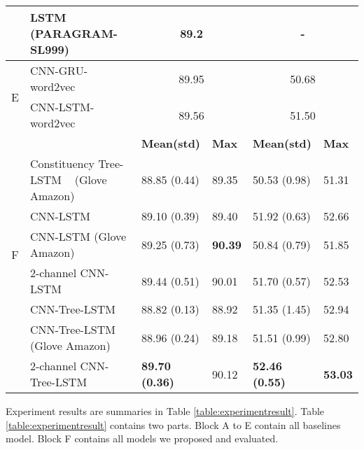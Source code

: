\begin{table*}[]
\begin{tabular}{|c|l|ll|ll|}
		& LSTM (PARAGRAM-SL999)~\cite{wieting2015towards} & \multicolumn{2}{c|}{89.2} & \multicolumn{2}{c|}{-}
		\\
		\hline
		\multirow{2}{*}{E}  & CNN-GRU-word2vec~\cite{cnn-rnn}                    &\multicolumn{2}{c|}{89.95} & \multicolumn{2}{c|}{50.68} \\
		& CNN-LSTM-word2vec~\cite{cnn-rnn}   &       \multicolumn{2}{c|}{89.56} & \multicolumn{2}{c|}{51.50} \Bstrut    \\
		\Xhline{3\arrayrulewidth}
		\Xhline{3\arrayrulewidth}
		&   & \textbf{Mean(std)} & \textbf{Max} & \textbf{Mean(std)} & \textbf{Max}  \\
		\cline{3-6}
		\multirow{6}{*}{F} & Constituency Tree-LSTM ~\cite{treeLSTM} (Glove Amazon) & 88.85 (0.44) & 89.35 & 50.53 (0.98) & 51.31 \Tstrut \\
		& CNN-LSTM                                 & 89.10 (0.39)  & 89.40 & 51.92 (0.63) & 52.66 \\
		& CNN-LSTM (Glove Amazon) & 89.25 (0.73) & \textbf{90.39}  & 50.84 (0.79) & 51.85 \\
		& 2-channel CNN-LSTM                        & 89.44    (0.51) & 90.01 & 51.70 (0.57) & 52.53 \\
		& CNN-Tree-LSTM                            & 88.82 (0.13) & 88.92 & 51.35 (1.45) & 52.94 \\
		& CNN-Tree-LSTM (Glove Amazon)             & 88.96 (0.24) & 89.18 & 51.51 (0.99) & 52.80 \\
		& 2-channel CNN-Tree-LSTM  & \textbf{89.70 (0.36)} & 90.12  & \textbf{52.46 (0.55)} & \textbf{53.03} \Bstrut  \\
		\hline
	\end{tabular}
\end{table*}
Experiment results are summaries in Table \ref{table:experimentresult}.
Table \ref{table:experimentresult} contains two parts.
Block A to E contain all baselines model.
Block F contains all models we proposed and evaluated.
